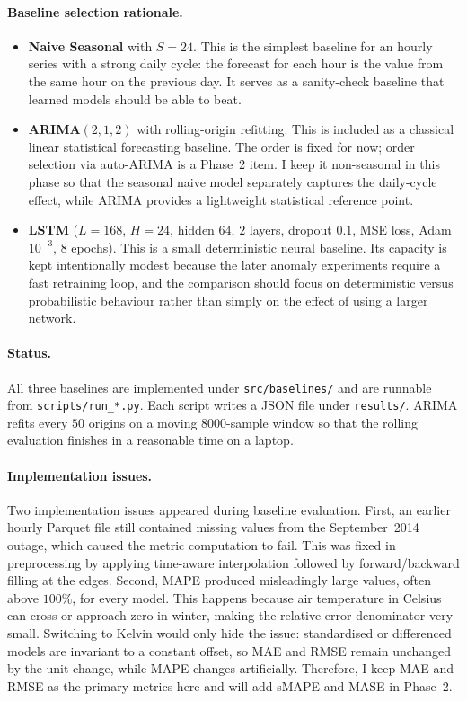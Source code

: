 \documentclass[11pt,a4paper]{article}
\begin{document}
\paragraph{Baseline selection rationale.}
\begin{itemize}
  \item \textbf{Naive Seasonal} with $S=24$. This is the simplest
        baseline for an hourly series with a strong daily cycle: the
        forecast for each hour is the value from the same hour on the
        previous day. It serves as a sanity-check baseline that learned
        models should be able to beat.

  \item \textbf{ARIMA}$(2,1,2)$ with rolling-origin refitting. This is
        included as a classical linear statistical forecasting baseline.
        The order is fixed for now; order selection via auto-ARIMA is a
        Phase~2 item. I keep it non-seasonal in this phase so that the
        seasonal naive model separately captures the daily-cycle effect,
        while ARIMA provides a lightweight statistical reference point.

  \item \textbf{LSTM} ($L=168$, $H=24$, hidden $64$, $2$ layers,
        dropout $0.1$, MSE loss, Adam $10^{-3}$, $8$ epochs). This is a
        small deterministic neural baseline. Its capacity is kept
        intentionally modest because the later anomaly experiments require
        a fast retraining loop, and the comparison should focus on
        deterministic versus probabilistic behaviour rather than simply
        on the effect of using a larger network.
\end{itemize}

\paragraph{Status.}
All three baselines are implemented under \texttt{src/baselines/} and
are runnable from \texttt{scripts/run\_*.py}. Each script writes a JSON
file under \texttt{results/}. ARIMA refits every $50$ origins on a
moving 8000-sample window so that the rolling evaluation finishes in a
reasonable time on a laptop.

\paragraph{Implementation issues.}
Two implementation issues appeared during baseline evaluation. First,
an earlier hourly Parquet file still contained missing values from the
September~2014 outage, which caused the metric computation to fail. This
was fixed in preprocessing by applying time-aware interpolation followed
by forward/backward filling at the edges. Second, MAPE produced
misleadingly large values, often above $100\%$, for every model. This
happens because air temperature in Celsius can cross or approach zero in
winter, making the relative-error denominator very small. Switching to
Kelvin would only hide the issue: standardised or differenced models are
invariant to a constant offset, so MAE and RMSE remain unchanged by the
unit change, while MAPE changes artificially. Therefore, I keep MAE and
RMSE as the primary metrics here and will add sMAPE and MASE in Phase~2.
\end{document}
